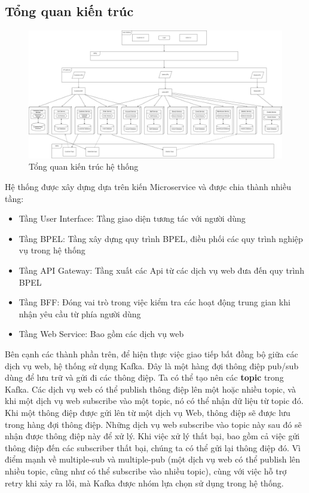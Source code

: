\subsection{Tổng quan kiến trúc}
 
\begin{figure}[!htp]
    \centering
    \includegraphics[width=6in]{img/Architecture/general-architect.png}
    \newline
    \caption{Tổng quan kiến trúc hệ thống}
\end{figure}
 
Hệ thống được xây dựng dựa trên kiến Microservice và được chia thành nhiều tầng:
\begin{itemize}
    \item Tầng User Interface: Tầng giao diện tương tác với người dùng
    \item Tầng BPEL: Tầng xây dựng quy trình BPEL, điều phối các quy trình nghiệp vụ trong hệ thống
    \item Tầng API Gateway: Tầng xuất các Api từ các dịch vụ web đưa đến quy trình BPEL
    \item Tầng BFF: Đóng vai trò trong việc kiểm tra các hoạt động trung gian khi nhận yêu cầu từ phía người dùng
    \item Tầng Web Service: Bao gồm các dịch vụ web
\end{itemize}
 
Bên cạnh các thành phần trên, để hiện thực việc giao tiếp bất đồng bộ giữa các dịch vụ web, hệ thống sử dụng Kafka. Đây là một hàng đợi thông điệp pub/sub dùng để lưu trữ và gửi đi các thông điệp.
Ta có thể tạo nên các \textbf{topic} trong Kafka. Các dịch vụ web có thể publish thông điệp lên một hoặc nhiều topic,
và khi một dịch vụ web subscribe vào một topic, nó có thể nhận dữ liệu từ topic đó.
Khi một thông điệp được gửi lên từ một dịch vụ Web, thông điệp sẽ được lưu trong hàng đợi thông điệp.
Những dịch vụ web subscribe vào topic này sau đó sẽ nhận được thông điệp này để xử lý.
Khi việc xử lý thất bại, bao gồm cả việc gửi thông điệp đến các subscriber thất bại, chúng ta có thể gửi lại thông điệp đó.
Vì điểm mạnh về multiple-sub và multiple-pub (một dịch vụ web có thể publish lên nhiều topic, cũng như có thể subscribe vào nhiều topic), cùng với việc hỗ trợ retry khi xảy ra lỗi, mà Kafka được nhóm lựa chọn sử dụng trong hệ thống.
 
